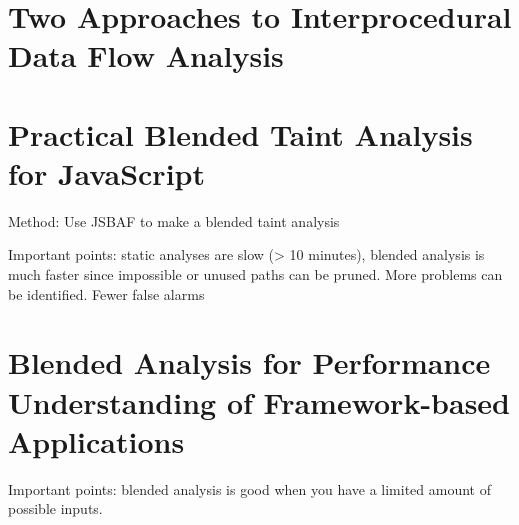 \section{Two Approaches to Interprocedural Data Flow Analysis}

\section{Practical Blended Taint Analysis for JavaScript}
Method: Use JSBAF to make a blended taint analysis

Important points: static analyses are slow (> 10 minutes), blended analysis is much faster since impossible or unused paths can be pruned. More problems can be identified. Fewer false alarms

\section{Blended Analysis for Performance Understanding of Framework-based Applications}
Important points: blended analysis is good when you have a limited amount of possible inputs.
